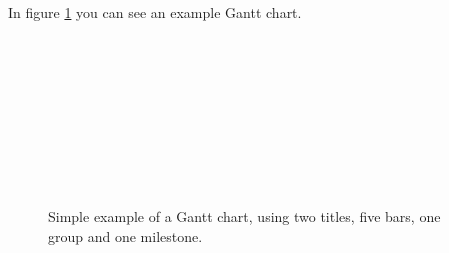\documentclass{article}
\begin{document}
 In figure \ref{fig-gantt} you can see an example Gantt chart.
 \begin{figure}
 \centering
    \begin{ganttchart}{11}
       \\
       \\
       \\
       \\
       \\
       \\
       \\
       \\
    \end{ganttchart}
  \caption{Simple example of a Gantt chart, using two titles, five bars, one group and one milestone.}
  \label{fig-gantt}
\end{figure}
\end{document}
